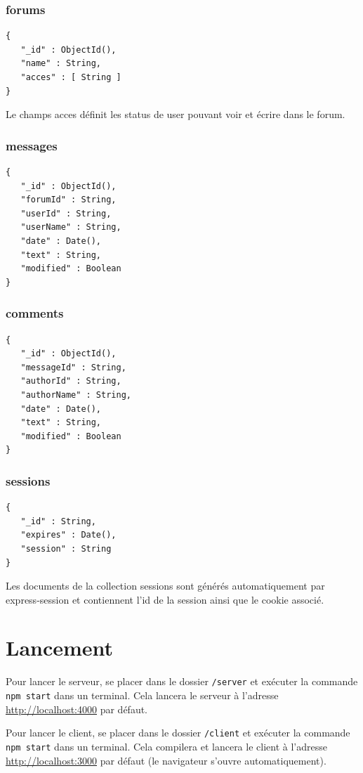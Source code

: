 \documentclass{article}
\begin{document}
\newpage

\subsubsection*{forums}
\begin{verbatim}
{
   "_id" : ObjectId(),
   "name" : String,
   "acces" : [ String ]
}
\end{verbatim}
Le champs acces définit les status de user pouvant voir et écrire dans le forum.

\subsubsection*{messages}
\begin{verbatim}
{
   "_id" : ObjectId(),
   "forumId" : String,
   "userId" : String,
   "userName" : String,
   "date" : Date(),
   "text" : String,
   "modified" : Boolean
}
\end{verbatim}

\subsubsection*{comments}
\begin{verbatim}
{
   "_id" : ObjectId(),
   "messageId" : String,
   "authorId" : String,
   "authorName" : String,
   "date" : Date(),
   "text" : String,
   "modified" : Boolean
}
\end{verbatim}

\subsubsection*{sessions}
\begin{verbatim}
{
   "_id" : String,
   "expires" : Date(),
   "session" : String
}
\end{verbatim}
Les documents de la collection sessions sont générés automatiquement par express-session et contiennent l'id de la session ainsi que le cookie associé.

\section{Lancement}
Pour lancer le serveur, se placer dans le dossier \texttt{/server} et exécuter la commande \texttt{npm start} dans un terminal. Cela lancera le serveur à l'adresse \url{http://localhost:4000} par défaut.

Pour lancer le client, se placer dans le dossier \texttt{/client} et exécuter la commande \texttt{npm start} dans un terminal. Cela compilera et lancera le client à l'adresse \url{http://localhost:3000} par défaut (le navigateur s'ouvre automatiquement).
\end{document}
